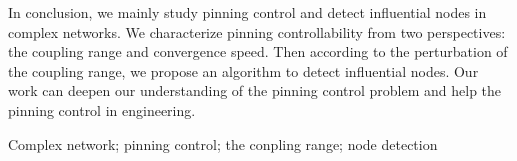 \begin{abstractEN}
In conclusion, we mainly study pinning control and detect influential nodes in complex networks.
We characterize pinning controllability from two perspectives: the coupling range and convergence speed.
Then according to the perturbation of the coupling range, we propose an algorithm to detect influential nodes.
Our work can deepen our understanding of the pinning control problem and help the pinning control in engineering.


\end{abstractEN}

\begin{keywordEN}
Complex network; pinning control; the conpling range; node detection
\end{keywordEN}
